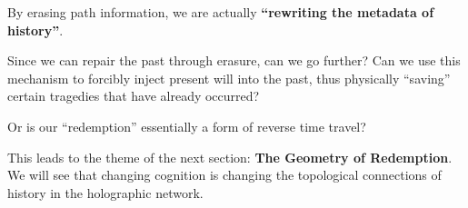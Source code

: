 By erasing path information, we are actually \textbf{``rewriting the metadata of history''}.

Since we can repair the past through erasure, can we go further? Can we use this mechanism to forcibly inject present will into the past, thus physically ``saving'' certain tragedies that have already occurred?

Or is our ``redemption'' essentially a form of reverse time travel?

This leads to the theme of the next section: \textbf{The Geometry of Redemption}. We will see that changing cognition is changing the topological connections of history in the holographic network.

